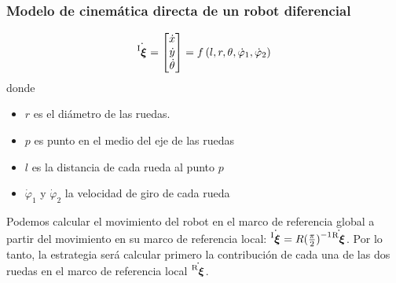 \begin{frame}
    \frametitle{Modelo de cinemática directa de un robot diferencial}
    \scriptsize
    \begin{figure}[!h]
        \centering
    \end{figure}

    \begin{equation*}
        \dot{\prescript{\mathrm{I}}{}{{\boldsymbol{\mathbf{\xi}}}_\mathrm{}}} =
        \begin{bmatrix}
            \dot{x}\\
            \dot{y}\\
            \dot{\theta}
        \end{bmatrix} =
        f\left( l,r,\theta,\dot{\varphi}_{1},\dot{\varphi}_{2}\right)
    \end{equation*}
    donde
    \begin{itemize}
        \item $r$ es el diámetro de las ruedas.
        \item $p$ es punto en el medio del eje de las ruedas
        \item $l$ es la distancia de cada rueda al punto $p$
        \item $\dot{\varphi}_{1}$ y $\dot{\varphi}_{2}$ la velocidad de giro de cada rueda
    \end{itemize}

    Podemos calcular el movimiento del robot en el marco de referencia global a partir del movimiento en su marco de referencia local:  $\dot{\prescript{\mathrm{I}}{}{{\boldsymbol{\mathbf{\xi}}}_\mathrm{}}} = {R(\frac{\pi}{2})}^{-1}\dot{\prescript{\mathrm{R}}{}{{\boldsymbol{\mathbf{\xi}}}_\mathrm{}}}$. Por lo tanto, la estrategia será calcular primero la contribución de cada una de las dos ruedas en el marco de referencia local $\dot{\prescript{\mathrm{R}}{}{{\boldsymbol{\mathbf{\xi}}}_\mathrm{}}}$.
\end{frame}

